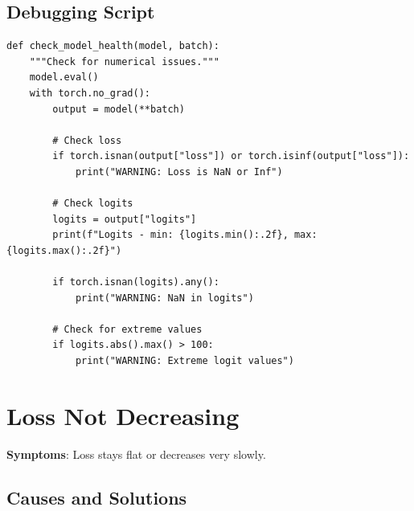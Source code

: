 \subsection{Debugging Script}

\begin{lstlisting}[style=python]
def check_model_health(model, batch):
    """Check for numerical issues."""
    model.eval()
    with torch.no_grad():
        output = model(**batch)

        # Check loss
        if torch.isnan(output["loss"]) or torch.isinf(output["loss"]):
            print("WARNING: Loss is NaN or Inf")

        # Check logits
        logits = output["logits"]
        print(f"Logits - min: {logits.min():.2f}, max: {logits.max():.2f}")

        if torch.isnan(logits).any():
            print("WARNING: NaN in logits")

        # Check for extreme values
        if logits.abs().max() > 100:
            print("WARNING: Extreme logit values")
\end{lstlisting}

\section{Loss Not Decreasing}

\textbf{Symptoms}: Loss stays flat or decreases very slowly.

\subsection{Causes and Solutions}

